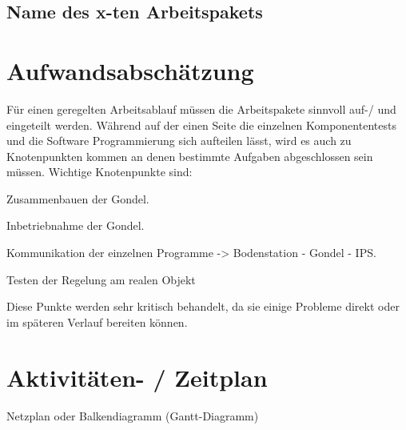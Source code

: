\documentclass[lang=ngerman,inputenc=utf8,fontsize=10pt]{ldvarticle}
\begin{document}
\subsection*{Name des x-ten Arbeitspakets}


\section{Aufwandsabschätzung}

Für einen geregelten Arbeitsablauf müssen die Arbeitspakete sinnvoll auf-/ und eingeteilt werden.
Während auf der einen Seite die einzelnen Komponententests und die Software Programmierung sich aufteilen lässt, wird es auch zu Knotenpunkten kommen an denen bestimmte Aufgaben abgeschlossen sein müssen. Wichtige Knotenpunkte sind:
\begin{list}{-}{}

\item Zusammenbauen der Gondel.
\item Inbetriebnahme der Gondel.
\item Kommunikation der einzelnen Programme -> Bodenstation - Gondel - IPS.
\item Testen der Regelung am realen Objekt
\end{list}

Diese Punkte werden sehr kritisch behandelt, da sie einige Probleme direkt oder im späteren Verlauf bereiten können.

\section{Aktivitäten- / Zeitplan}

Netzplan oder Balkendiagramm (Gantt-Diagramm)
\end{document}
